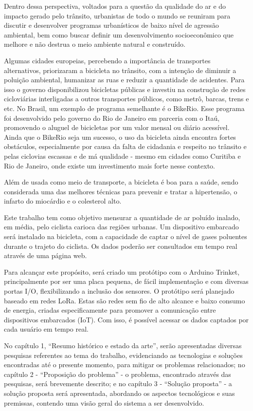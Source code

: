Dentro dessa perspectiva, voltados para a questão da qualidade do ar e do impacto gerado pelo 
trânsito, urbanistas de todo o mundo se reuniram para discutir e desenvolver programas urbanísticos 
de baixo nível de agressão ambiental, bem como buscar definir um desenvolvimento socioeconômico que 
melhore e não destrua o meio ambiente natural e construído.

Algumas cidades europeias, percebendo a importância de transportes alternativos, priorizaram a 
bicicleta no trânsito, com a intenção de diminuir a poluição ambiental, humanizar as ruas e reduzir 
a quantidade de acidentes. Para isso o governo disponibilizou bicicletas públicas e investiu na 
construção de redes cicloviárias interligadas a outros transportes públicos, como metrô, barcas, 
trens e etc. No Brasil, um exemplo de programa semelhante é o BikeRio. Esse programa foi desenvolvido 
pelo governo do Rio de Janeiro em parceria com o Itaú, promovendo o aluguel de bicicletas por um 
valor mensal ou diário acessível. Ainda que o BikeRio seja um sucesso, o uso da bicicleta ainda 
encontra fortes obstáculos, especialmente por causa da falta de cidadania e respeito no trânsito e 
pelas ciclovias escassas e de má qualidade - mesmo em cidades como Curitiba e Rio de Janeiro, onde 
existe um investimento mais forte nesse contexto.

Além de usada como meio de transporte, a bicicleta é boa para a saúde, sendo considerada uma das 
melhores técnicas para prevenir e tratar a hipertensão, o infarto do miocárdio e o colesterol alto.

Este trabalho tem como objetivo mensurar a quantidade de ar poluído inalado, em média, pelo ciclista 
carioca das regiões urbanas. Um dispositivo embarcado será instalado na bicicleta, com a capacidade 
de captar o nível de gases poluentes durante o trajeto do ciclista. Os dados poderão ser consultados 
em tempo real através de uma página web.

Para alcançar este propósito, será criado um protótipo com o Arduino Trinket, principalmente por ser 
uma placa pequena, de fácil implementação e com diversas portas I/O, flexibilizando a inclusão dos 
sensores. O protótipo será planejado baseado em redes LoRa. Estas são redes sem fio de alto alcance 
e baixo consumo de energia, criadas especificamente para promover a comunicação entre dispositivos 
embarcados (IoT). Com isso, é possível acessar os dados captados por cada usuário em tempo real.

No capítulo 1, ``Resumo histórico e estado da arte'', serão apresentadas diversas pesquisas 
referentes ao tema do trabalho, evidenciando as tecnologias e soluções encontradas até o presente 
momento, para mitigar os problemas relacionados; no capítulo 2 - ``Proposição do problema'' - o 
problema, encontrado através das pesquisas, será brevemente descrito; e no capítulo 3 - ``Solução 
proposta'' - a solução proposta será apresentada, abordando os aspectos tecnológicos e suas 
premissas, contendo uma visão geral do sistema a ser desenvolvido.

